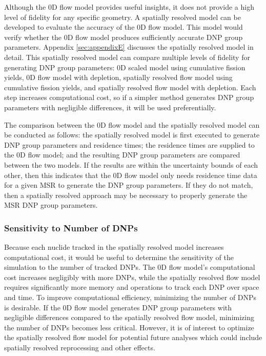 Although the 0D flow model provides useful insights, it does not provide a high level of fidelity for any specific geometry.
A spatially resolved model can be developed to evaluate the accuracy of the 0D flow model.
This model would verify whether the 0D flow model produces sufficiently accurate \gls{DNP} group parameters.
Appendix \ref{sec:appendixE} discusses the spatially resolved model in detail.
This spatially resolved model can compare multiple levels of fidelity for generating \gls{DNP} group parameters: 0D scaled model using cumulative fission yields, 0D flow model with depletion, spatially resolved flow model using cumulative fission yields, and spatially resolved flow model with depletion.
Each step increases computational cost, so if a simpler method generates \gls{DNP} group parameters with negligible differences, it will be used preferentially.

The comparison between the 0D flow model and the spatially resolved model can be conducted as follows: the spatially resolved model is first executed to generate \gls{DNP} group parameters and residence times; the residence times are supplied to the 0D flow model; and the resulting \gls{DNP} group parameters are compared between the two models.
If the results are within the uncertainty bounds of each other, then this indicates that the 0D flow model only needs residence time data for a given \gls{MSR} to generate the \gls{DNP} group parameters.
If they do not match, then a spatially resolved approach may be necessary to properly generate the \gls{MSR} \gls{DNP} group parameters.

\subsubsection{Sensitivity to Number of DNPs}
Because each nuclide tracked in the spatially resolved model increases computational cost, it would be useful to determine the sensitivity of the simulation to the number of tracked \glspl{DNP}.
The 0D flow model's computational cost increases negligibly with more \glspl{DNP}, while the spatially resolved flow model requires significantly more memory and operations to track each \gls{DNP} over space and time.
To improve computational efficiency, minimizing the number of \glspl{DNP} is desirable.
If the 0D flow model generates \gls{DNP} group parameters with negligible differences compared to the spatially resolved flow model, minimizing the number of \glspl{DNP} becomes less critical.
However, it is of interest to optimize the spatially resolved flow model for potential future analyses which could include spatially resolved reprocessing and other effects.

